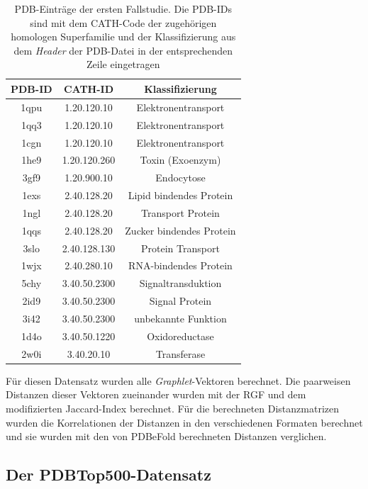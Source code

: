 \documentclass{report}
\begin{document}
\begin{table}[h!]
\label{tab:set1}
\begin{tabular}{ | c || c | c |}

\hline
PDB-ID & CATH-ID        & Klassifizierung      \\ \hline
1qpu   & 1.20.120.10 & Elektronentransport     \\ \hline
1qq3   & 1.20.120.10 & Elektronentransport     \\ \hline
1cgn   & 1.20.120.10 & Elektronentransport     \\ \hline
1he9   & 1.20.120.260& Toxin (Exoenzym)        \\ \hline
3gf9   & 1.20.900.10 & Endocytose              \\ \hline
1exs   & 2.40.128.20 & Lipid bindendes Protein \\ \hline
1ngl   & 2.40.128.20 & Transport Protein       \\ \hline
1qqs   & 2.40.128.20 & Zucker bindendes Protein\\ \hline
3slo   & 2.40.128.130& Protein Transport       \\ \hline
1wjx   & 2.40.280.10 & RNA-bindendes Protein   \\ \hline
5chy   & 3.40.50.2300& Signaltransduktion      \\ \hline
2id9   & 3.40.50.2300& Signal Protein          \\ \hline
3i42   & 3.40.50.2300& unbekannte Funktion     \\ \hline
1d4o   & 3.40.50.1220& Oxidoreductase          \\ \hline
2w0i   & 3.40.20.10  & Transferase             \\ 
\hline
\end{tabular}
\caption{PDB-Eintr\"age der ersten Fallstudie. Die PDB-IDs sind mit dem CATH-Code der zugeh\"origen homologen Superfamilie und der Klassifizierung aus dem \textit{Header} der PDB-Datei in der entsprechenden Zeile eingetragen}
\end{table}

F\"ur diesen Datensatz wurden alle \textit{Graphlet}-Vektoren berechnet. Die paarweisen Distanzen dieser Vektoren zueinander wurden mit der RGF und dem modifizierten Jaccard-Index berechnet. F\"ur die berechneten Distanzmatrizen wurden die Korrelationen der Distanzen in den verschiedenen Formaten berechnet und sie wurden mit den von PDBeFold berechneten Distanzen verglichen. 



\subsection{Der PDBTop500-Datensatz}
\end{document}
